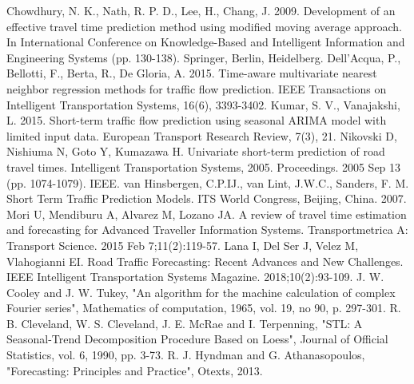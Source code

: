 \documentclass[letterpaper, 10 pt, conference]{ieeeconf}  %
\begin{document}
\begin{thebibliography}{00}
 Chowdhury, N. K., Nath, R. P. D., Lee, H., Chang, J. 2009. Development of an effective travel time prediction method using modified moving average approach. In International Conference on Knowledge-Based and Intelligent Information and Engineering Systems (pp. 130-138). Springer, Berlin, Heidelberg.
 Dell'Acqua, P., Bellotti, F., Berta, R., De Gloria, A. 2015. Time-aware multivariate nearest neighbor regression methods for traffic flow prediction. IEEE Transactions on Intelligent Transportation Systems, 16(6), 3393-3402.
 Kumar, S. V., Vanajakshi, L. 2015. Short-term traffic flow prediction using seasonal ARIMA model with limited input data. European Transport Research Review, 7(3), 21.
 Nikovski D, Nishiuma N, Goto Y, Kumazawa H. Univariate short-term prediction of road travel times. Intelligent Transportation Systems, 2005. Proceedings. 2005 Sep 13 (pp. 1074-1079). IEEE.
 van Hinsbergen, C.P.IJ., van Lint, J.W.C.,  Sanders, F. M. Short Term Traffic Prediction Models. ITS World Congress, Beijing, China. 2007.
 Mori U, Mendiburu A, Alvarez M, Lozano JA. A review of travel time estimation and forecasting for Advanced Traveller Information Systems. Transportmetrica A: Transport Science. 2015 Feb 7;11(2):119-57.
 Lana I, Del Ser J, Velez M, Vlahogianni EI. Road Traffic Forecasting: Recent Advances and New Challenges. IEEE Intelligent Transportation Systems Magazine. 2018;10(2):93-109.
 J. W. Cooley and J. W. Tukey, "An algorithm for the machine calculation of complex Fourier series", Mathematics of computation, 1965, vol. 19, no 90, p. 297-301.
 R. B. Cleveland, W. S. Cleveland, J. E. McRae and I. Terpenning, "STL: A Seasonal-Trend Decomposition Procedure Based on Loess", Journal of Official Statistics, vol. 6, 1990, pp. 3-73.
 R. J. Hyndman and G. Athanasopoulos, "Forecasting: Principles and Practice", Otexts, 2013.
\end{thebibliography}
\end{document}
